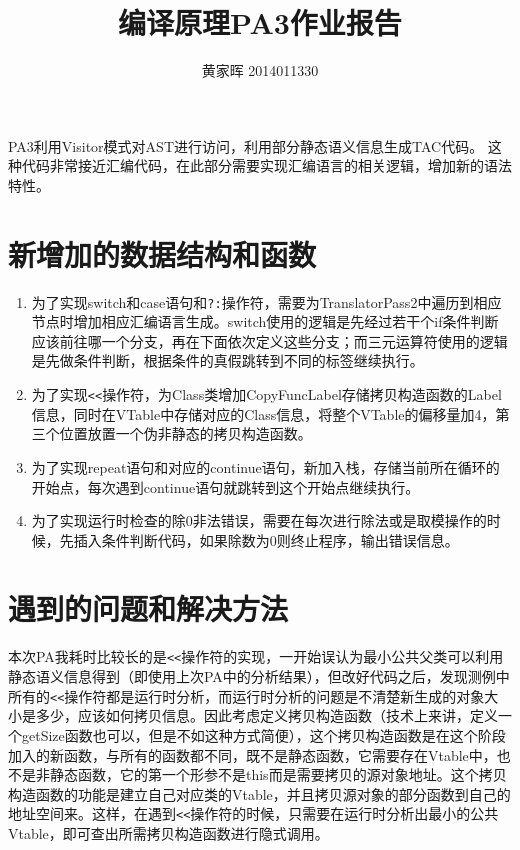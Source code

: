 \documentclass[12pt,a4paper]{article}
\title{编译原理PA3作业报告}
\author{黄家晖 2014011330}
\date{}
\begin{document}
\maketitle

PA3利用Visitor模式对AST进行访问，利用部分静态语义信息生成TAC代码。
这种代码非常接近汇编代码，在此部分需要实现汇编语言的相关逻辑，增加新的语法特性。

\section{新增加的数据结构和函数}
\begin{enumerate}
\item 为了实现switch和case语句和\texttt{?:}操作符，需要为TranslatorPass2中遍历到相应节点时增加相应汇编语言生成。switch使用的逻辑是先经过若干个if条件判断应该前往哪一个分支，再在下面依次定义这些分支；而三元运算符使用的逻辑是先做条件判断，根据条件的真假跳转到不同的标签继续执行。
\item 为了实现\texttt{<<}操作符，为Class类增加CopyFuncLabel存储拷贝构造函数的Label信息，同时在VTable中存储对应的Class信息，将整个VTable的偏移量加4，第三个位置放置一个伪非静态的拷贝构造函数。
\item 为了实现repeat语句和对应的continue语句，新加入栈，存储当前所在循环的开始点，每次遇到continue语句就跳转到这个开始点继续执行。
\item 为了实现运行时检查的除0非法错误，需要在每次进行除法或是取模操作的时候，先插入条件判断代码，如果除数为0则终止程序，输出错误信息。
\end{enumerate}

\section{遇到的问题和解决方法}

本次PA我耗时比较长的是\texttt{<<}操作符的实现，一开始误认为最小公共父类可以利用静态语义信息得到（即使用上次PA中的分析结果），但改好代码之后，发现测例中所有的\texttt{<<}操作符都是运行时分析，而运行时分析的问题是不清楚新生成的对象大小是多少，应该如何拷贝信息。因此考虑定义拷贝构造函数（技术上来讲，定义一个getSize函数也可以，但是不如这种方式简便），这个拷贝构造函数是在这个阶段加入的新函数，与所有的函数都不同，既不是静态函数，它需要存在Vtable中，也不是非静态函数，它的第一个形参不是this而是需要拷贝的源对象地址。这个拷贝构造函数的功能是建立自己对应类的Vtable，并且拷贝源对象的部分函数到自己的地址空间来。这样，在遇到\texttt{<<}操作符的时候，只需要在运行时分析出最小的公共Vtable，即可查出所需拷贝构造函数进行隐式调用。
\end{document}
